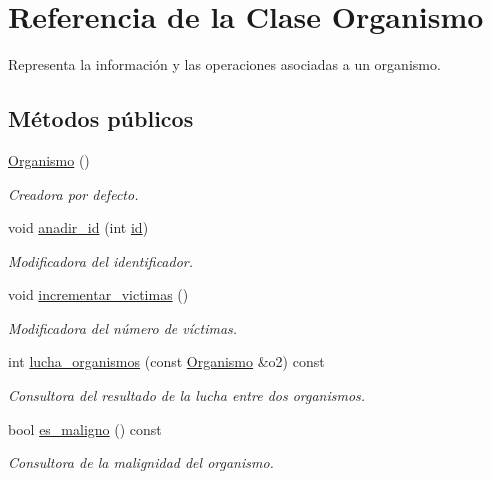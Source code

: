 \hypertarget{class_organismo}{}\section{Referencia de la Clase Organismo}
\label{class_organismo}


Representa la información y las operaciones asociadas a un organismo.  


\subsection*{Métodos públicos}
\begin{DoxyCompactItemize}
\item 
\hyperlink{class_organismo_aa5dbeed205b53c0e555ef2a6456da144}{Organismo} ()
\begin{DoxyCompactList}\small\item\em Creadora por defecto. \end{DoxyCompactList}\item 
void \hyperlink{class_organismo_a4fa50ea637c25ee2b04bd1805ec634dc}{anadir\+\_\+id} (int \hyperlink{class_organismo_a30be1823d3711fec651a5a4b1dc1cee5}{id})
\begin{DoxyCompactList}\small\item\em Modificadora del identificador. \end{DoxyCompactList}\item 
void \hyperlink{class_organismo_ae498385e40b42c4e9b11226befd6e4c6}{incrementar\+\_\+victimas} ()
\begin{DoxyCompactList}\small\item\em Modificadora del número de víctimas. \end{DoxyCompactList}\item 
int \hyperlink{class_organismo_a2f4573f69288fa8ec05ec709f2336a8d}{lucha\+\_\+organismos} (const \hyperlink{class_organismo}{Organismo} \&o2) const 
\begin{DoxyCompactList}\small\item\em Consultora del resultado de la lucha entre dos organismos. \end{DoxyCompactList}\item 
bool \hyperlink{class_organismo_aa746619493d11ed0b2eb2c75ce202ad0}{es\+\_\+maligno} () const 
\begin{DoxyCompactList}\small\item\em Consultora de la malignidad del organismo. \end{DoxyCompactList}\item 

\end{DoxyCompactItemize}

